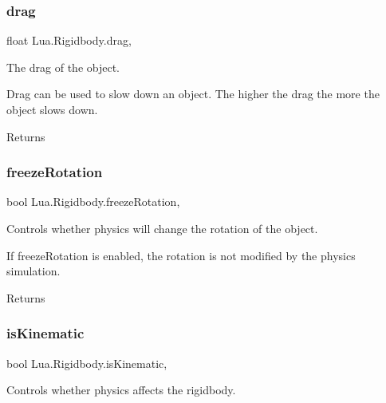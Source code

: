 \subsubsection{\texorpdfstring{drag}{drag}}
{\footnotesize\ttfamily float Lua.\+Rigidbody.\+drag\hspace{0.3cm}{\ttfamily [get]}, {\ttfamily [set]}}



The drag of the object. 

Drag can be used to slow down an object. The higher the drag the more the object slows down. \begin{DoxyReturn}{Returns}

\end{DoxyReturn}
\mbox{\label{class_lua_1_1_rigidbody_ad3f2380221d01eedada3df4d282a37d4}} 
\subsubsection{\texorpdfstring{freezeRotation}{freezeRotation}}
{\footnotesize\ttfamily bool Lua.\+Rigidbody.\+freeze\+Rotation\hspace{0.3cm}{\ttfamily [get]}, {\ttfamily [set]}}



Controls whether physics will change the rotation of the object. 

If freeze\+Rotation is enabled, the rotation is not modified by the physics simulation. \begin{DoxyReturn}{Returns}

\end{DoxyReturn}
\mbox{\label{class_lua_1_1_rigidbody_aee1018d4d56ab085d013acc494c0d0f9}} 
\subsubsection{\texorpdfstring{isKinematic}{isKinematic}}
{\footnotesize\ttfamily bool Lua.\+Rigidbody.\+is\+Kinematic\hspace{0.3cm}{\ttfamily [get]}, {\ttfamily [set]}}



Controls whether physics affects the rigidbody. 

